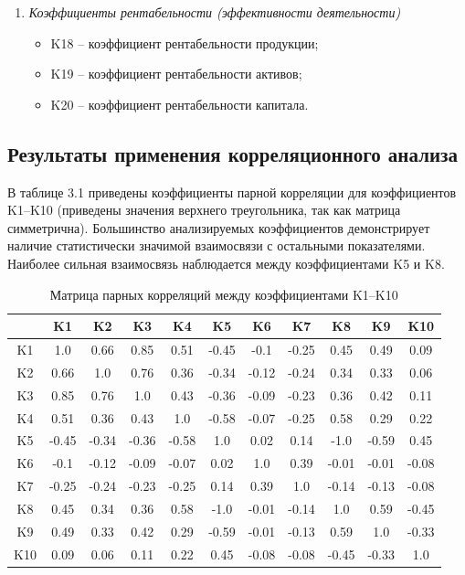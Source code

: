 \documentclass[14pt,a4paper]{extarticle}
\begin{document}
\begin{enumerate}[label=\Roman*.]
    \item \textit{Коэффициенты рентабельности (эффективности деятельности)}
    \begin{itemize}
        \item K18 -- коэффициент рентабельности продукции;
        \item K19 -- коэффициент рентабельности активов;
        \item K20 -- коэффициент рентабельности капитала.
    \end{itemize}
\end{enumerate}

\subsection{Результаты применения корреляционного анализа}

В таблице 3.1 приведены коэффициенты парной корреляции для коэффициентов K1--K10 (приведены значения верхнего треугольника, так как матрица симметрична). Большинство анализируемых коэффициентов демонстрирует наличие статистически значимой взаимосвязи с остальными показателями. Наиболее сильная взаимосвязь наблюдается между коэффициентами K5 и K8.

\begin{table}[H]
    \centering
    \caption{Матрица парных корреляций между коэффициентами K1--K10}
    \label{tab:corr}
    \small
    \begin{tabular}{c|cccccccccc}
        \toprule
        & K1 & K2 & K3 & K4 & K5 & K6 & K7 & K8 & K9 & K10 \\
        \midrule
        K1  & 1.0  & 0.66 & 0.85 & 0.51 & -0.45 & -0.1  & -0.25 & 0.45 & 0.49 & 0.09 \\
        K2  & 0.66 & 1.0  & 0.76 & 0.36 & -0.34 & -0.12 & -0.24 & 0.34 & 0.33 & 0.06 \\
        K3  & 0.85 & 0.76 & 1.0  & 0.43 & -0.36 & -0.09 & -0.23 & 0.36 & 0.42 & 0.11 \\
        K4  & 0.51 & 0.36 & 0.43 & 1.0  & -0.58 & -0.07 & -0.25 & 0.58 & 0.29 & 0.22 \\
        K5  & -0.45& -0.34& -0.36& -0.58& 1.0   & 0.02  & 0.14  & -1.0  & -0.59& 0.45 \\
        K6  & -0.1 & -0.12& -0.09& -0.07& 0.02  & 1.0   & 0.39  & -0.01 & -0.01& -0.08\\
        K7  & -0.25& -0.24& -0.23& -0.25& 0.14  & 0.39  & 1.0   & -0.14 & -0.13& -0.08\\
        K8  & 0.45 & 0.34 & 0.36 & 0.58 & -1.0  & -0.01 & -0.14 & 1.0   & 0.59 & -0.45\\
        K9  & 0.49 & 0.33 & 0.42 & 0.29 & -0.59 & -0.01 & -0.13 & 0.59  & 1.0  & -0.33\\
        K10 & 0.09 & 0.06 & 0.11 & 0.22 & 0.45  & -0.08 & -0.08 & -0.45 & -0.33& 1.0 \\
        \bottomrule
    \end{tabular}
\end{table}
\end{document}

